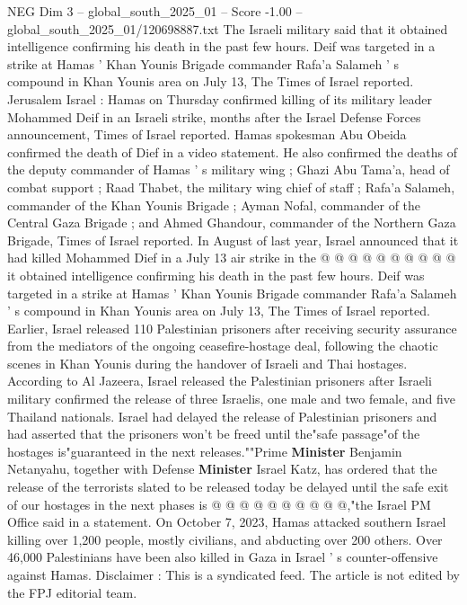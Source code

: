 \begin{textsample}{NEG Dim 3 – global\_south\_2025\_01 – Score -1.00 – global\_south\_2025\_01/120698887.txt}  \label{ex:f3_neg_056}
The Israeli military said that it obtained intelligence confirming his death in the past few hours.
Deif was targeted in a strike at Hamas ' Khan Younis Brigade commander Rafa'a Salameh ' s compound in Khan Younis area on July 13, The Times of Israel reported.
Jerusalem Israel : Hamas on Thursday confirmed killing of its military leader Mohammed Deif in an Israeli strike, months after the Israel Defense Forces announcement, Times of Israel reported.
Hamas spokesman Abu Obeida confirmed the death of Dief in a video statement.
He also confirmed the deaths of the deputy commander of Hamas ' s military wing ; Ghazi Abu Tama'a, head of combat support ; Raad Thabet, the military wing chief of staff ; Rafa'a Salameh, commander of the Khan Younis Brigade ; Ayman Nofal, commander of the Central Gaza Brigade ; and Ahmed Ghandour, commander of the Northern Gaza Brigade, Times of Israel reported.
In August of last year, Israel announced that it had killed Mohammed Dief in a July 13 air strike in the @ @ @ @ @ @ @ @ @ @ it obtained intelligence confirming his death in the past few hours.
Deif was targeted in a strike at Hamas ' Khan Younis Brigade commander Rafa'a Salameh ' s compound in Khan Younis area on July 13, The Times of Israel reported.
Earlier, Israel released 110 Palestinian prisoners after receiving security assurance from the mediators of the ongoing ceasefire-hostage deal, following the chaotic scenes in Khan Younis during the handover of Israeli and Thai hostages.
According to Al Jazeera, Israel released the Palestinian prisoners after Israeli military confirmed the release of three Israelis, one male and two female, and five Thailand nationals.
Israel had delayed the release of Palestinian prisoners and had asserted that the prisoners won't be freed until the"safe passage"of the hostages is"guaranteed in the next releases.""Prime \textbf{Minister} Benjamin Netanyahu, together with Defense \textbf{Minister} Israel Katz, has ordered that the release of the terrorists slated to be released today be delayed until the safe exit of our hostages in the next phases is @ @ @ @ @ @ @ @ @ @,"the Israel PM Office said in a statement.
On October 7, 2023, Hamas attacked southern Israel killing over 1,200 people, mostly civilians, and abducting over 200 others.
Over 46,000 Palestinians have been also killed in Gaza in Israel ' s counter-offensive against Hamas.
Disclaimer : This is a syndicated feed.
The article is not edited by the FPJ editorial team.

\end{textsample}
